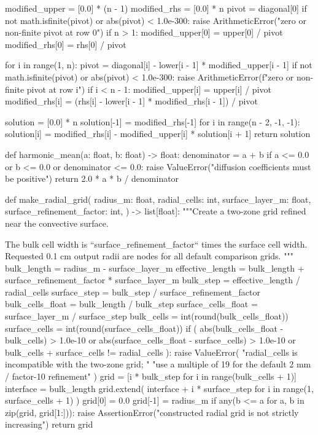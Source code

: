 \documentclass[withoutpreface,bwprint]{cumcmthesis}
\begin{document}
\begin{PythonCode}
    modified_upper = [0.0] * (n - 1)
    modified_rhs = [0.0] * n
    pivot = diagonal[0]
    if not math.isfinite(pivot) or abs(pivot) < 1.0e-300:
        raise ArithmeticError("zero or non-finite pivot at row 0")
    if n > 1:
        modified_upper[0] = upper[0] / pivot
    modified_rhs[0] = rhs[0] / pivot

    for i in range(1, n):
        pivot = diagonal[i] - lower[i - 1] * modified_upper[i - 1]
        if not math.isfinite(pivot) or abs(pivot) < 1.0e-300:
            raise ArithmeticError(f"zero or non-finite pivot at row {i}")
        if i < n - 1:
            modified_upper[i] = upper[i] / pivot
        modified_rhs[i] = (rhs[i] - lower[i - 1] * modified_rhs[i - 1]) / pivot

    solution = [0.0] * n
    solution[-1] = modified_rhs[-1]
    for i in range(n - 2, -1, -1):
        solution[i] = modified_rhs[i] - modified_upper[i] * solution[i + 1]
    return solution


def harmonic_mean(a: float, b: float) -> float:
    denominator = a + b
    if a <= 0.0 or b <= 0.0 or denominator <= 0.0:
        raise ValueError("diffusion coefficients must be positive")
    return 2.0 * a * b / denominator


def make_radial_grid(
    radius_m: float,
    radial_cells: int,
    surface_layer_m: float,
    surface_refinement_factor: int,
) -> list[float]:
    """Create a two-zone grid refined near the convective surface.

    The bulk cell width is ``surface_refinement_factor`` times the surface
    cell width. Requested 0.1 cm output radii are nodes for all default
    comparison grids.
    """
    bulk_length = radius_m - surface_layer_m
    effective_length = bulk_length + surface_refinement_factor * surface_layer_m
    bulk_step = effective_length / radial_cells
    surface_step = bulk_step / surface_refinement_factor
    bulk_cells_float = bulk_length / bulk_step
    surface_cells_float = surface_layer_m / surface_step
    bulk_cells = int(round(bulk_cells_float))
    surface_cells = int(round(surface_cells_float))
    if (
        abs(bulk_cells_float - bulk_cells) > 1.0e-10
        or abs(surface_cells_float - surface_cells) > 1.0e-10
        or bulk_cells + surface_cells != radial_cells
    ):
        raise ValueError(
            "radial_cells is incompatible with the two-zone grid; "
            "use a multiple of 19 for the default 2 mm / factor-10 refinement"
        )
    grid = [i * bulk_step for i in range(bulk_cells + 1)]
    interface = bulk_length
    grid.extend(
        interface + i * surface_step for i in range(1, surface_cells + 1)
    )
    grid[0] = 0.0
    grid[-1] = radius_m
    if any(b <= a for a, b in zip(grid, grid[1:])):
        raise AssertionError("constructed radial grid is not strictly increasing")
    return grid



\end{PythonCode}
\end{document}
